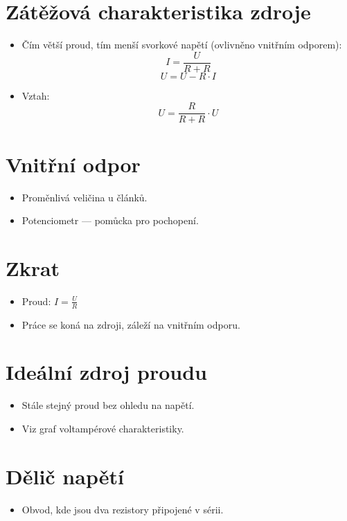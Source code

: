 \documentclass{article}
\begin{document}
\section{Zátěžová charakteristika zdroje}

\begin{itemize}
    \item Čím větší proud, tím menší svorkové napětí (ovlivněno vnitřním\- odporem):
    \[
    I = \frac{U}{R + R}
    \]
    \[
    U = U - R \cdot I
    \]
    \item Vztah:
    \[
    U = \frac{R}{R + R} \cdot U
    \]
\end{itemize}

\section{Vnitřní odpor}
\begin{itemize}
    \item Proměnlivá veličina u článků.
    \item Potenciometr — pomůcka pro pochopení.
\end{itemize}

\section{Zkrat}
\begin{itemize}
    \item Proud: \( I = \frac{U}{R} \)
    \item Práce se koná na zdroji, záleží na vnitřním odporu.
\end{itemize}

\section{Ideální zdroj proudu}
\begin{itemize}
    \item Stále stejný proud bez ohledu na napětí.
    \item Viz graf voltampérové charakteristiky.
\end{itemize}

\section{Dělič napětí}
\begin{itemize}
    \item Obvod, kde jsou dva rezistory připojené v sérii.
\end{itemize}
\end{document}
